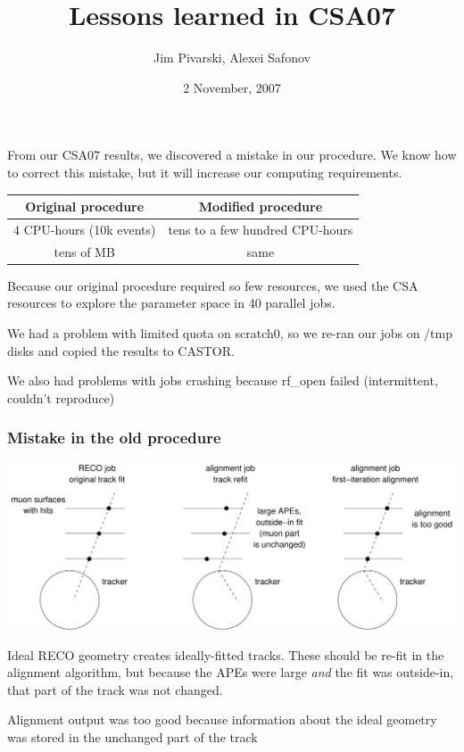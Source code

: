 \documentclass[compress]{beamer}
\title{Lessons learned in CSA07}
\author{Jim Pivarski, Alexei Safonov}
\institute{Texas A\&M University}
\date{ 2 November, 2007}
\begin{document}
\frame{\titlepage}


\begin{frame}
From our CSA07 results, we discovered a mistake in our procedure.  We
know how to correct this mistake, but it will increase our computing
requirements.

\vfill \begin{tabular}{c c}
Original procedure & Modified procedure \\\hline
4 CPU-hours (10k events) & tens to a few hundred CPU-hours \\
tens of MB & same \\
\end{tabular}

\vfill Because our original procedure required so few resources, we used the
CSA resources to explore the parameter space in 40 parallel jobs.

\vfill We had a problem with limited quota on scratch0, so we re-ran our jobs
on /tmp disks and copied the results to CASTOR.

\vfill We also had problems with jobs crashing because rf\_open failed
(intermittent, couldn't reproduce)
\end{frame}

\begin{frame}
\frametitle{Mistake in the old procedure}

\includegraphics[width=\linewidth]{mistake.pdf}

\vfill Ideal RECO geometry creates ideally-fitted tracks.  These
should be re-fit in the alignment algorithm, but because the APEs were
large {\it and} the fit was outside-in, that part of the track was not changed.

\vfill Alignment output was too good because information about the
ideal geometry was stored in the unchanged part of the track
\end{frame}
\end{document}
